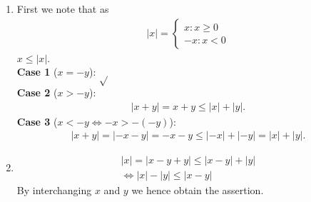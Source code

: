 {\color{solution}
\begin{enumerate}
	\item First we note that as 
	\begin{align*}
	|x| = \begin{cases}
	x: x \geq 0\\
	-x : x < 0
	\end{cases}
	\end{align*}
	$x \leq |x|$.\\
	\textbf{Case 1} ($x = -y$): $\sqrt{ }$\\	
	\textbf{Case 2} ($x > -y$):
	\begin{align*}
	|x+y| = x+y \leq |x| + |y|.
	\end{align*}
	\textbf{Case 3} ($x < -y \Leftrightarrow -x >- (-y)$):
	\begin{align*}
	|x+y| = |-x-y| = -x-y \leq |-x| + |-y| = |x| + |y|.
	\end{align*}
	
	\item 
	\begin{align*}
	|x| = |x - y + y| \leq |x-y| + |y|\\
	\Leftrightarrow |x| - |y| \leq |x-y|
	\end{align*}
	By interchanging $x$ and $y$ we hence obtain the assertion.
\end{enumerate}
}